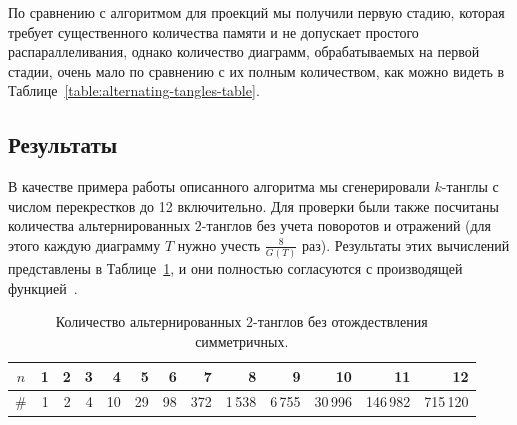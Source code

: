 \documentclass[12pt]{article}
\theoremstyle{plain}
\theoremstyle{definition}
\begin{document}
		По сравнению с алгоритмом для проекций мы получили первую стадию, которая требует существенного количества памяти и не допускает
		простого распараллеливания, однако количество диаграмм, обрабатываемых на первой стадии, очень мало по сравнению с их полным
		количеством, как можно видеть в Таблице~\ref{table:alternating-tangles-table}.

	\subsection{Результаты}

		В качестве примера работы описанного алгоритма мы сгенерировали $k$-танглы с числом перекрестков до 12 включительно.
		Для проверки были также посчитаны количества альтернированных $2$-танглов без учета поворотов и отражений (для этого
		каждую диаграмму $T$ нужно учесть $\frac{8}{G(T)}$ раз). Результаты этих вычислений представлены в
		Таблице~\ref{table:old-results-table}, и они полностью согласуются с производящей функцией~\cite{SundbergThistlethwaite1998}.

		\begin{table}[ht]
			\footnotesize
			\caption{\small Количество альтернированных $2$-танглов без отождествления симметричных.\label{table:old-results-table}}
			\centering
			\begin{tabular}{|c||r|r|r|r|r|r|r|r|r|r|r|r|}
				\hline
				$n$ & 1 & 2 & 3 &  4 &  5 &  6 &   7 &      8 &      9 &      10 &       11 &       12 \\
				\hline\hline
				\#  & 1 & 2 & 4 & 10 & 29 & 98 & 372 & 1\,538 & 6\,755 & 30\,996 & 146\,982 & 715\,120 \\
				\hline
			\end{tabular}
		\end{table}
\end{document}
